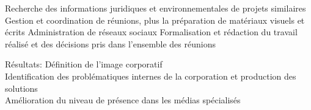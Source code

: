 \documentclass[30pt, french]{tccv}
\begin{document}
\begin{upshape}
\begin{textblock}{13}
\begin{mdframed}
\begin{eventlist}
\setlength{\parskip}{-10pt}
\begin{itemize}
      \setlength\itemsep{-3pt} 
      \cvitem[\checkmark] Recherche des informations juridiques et environnementales de projets similaires          
      \cvitem[\checkmark] Gestion et coordination de réunions, plus la préparation de matériaux visuels et écrits   
      \cvitem[\checkmark] Administration de réseaux sociaux                                                                    
      \cvitem[\checkmark] Formalisation et rédaction du travail réalisé et des décisions pris dans l’ensemble des réunions     
\end{itemize}      

Résultats: Définition de l’image corporatif \\
Identification des problématiques internes de la corporation et production des solutions \\
Amélioration du niveau de présence dans les médias spécialisés \\


  
  


   


\end{eventlist}


\end{mdframed}
\end{textblock}

\end{upshape}
\end{document}
